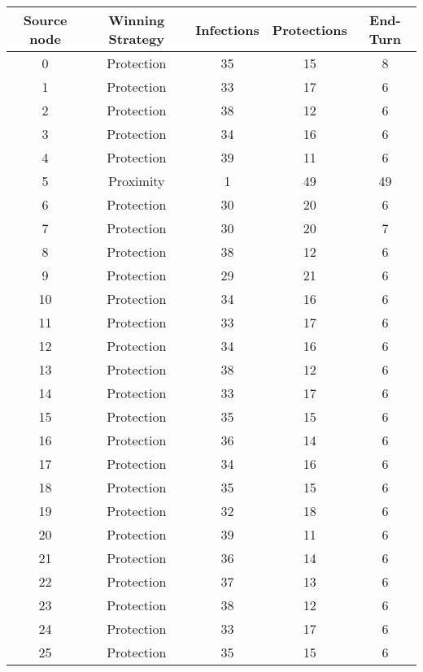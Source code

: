 \documentclass[results.tex]{subfiles}
\begin{document}
\begin{center}
  \begin{tabular}{| c || c | c | c | c |}
    \hline
    {\bfseries Source node} & {\bfseries Winning Strategy} & {\bfseries Infections} & {\bfseries Protections} & {\bfseries End-Turn} \\  %
    \hline\hline
    0 & Protection & 35 & 15 & 8 \\ 
    \hline
    1 & Protection & 33 & 17 & 6 \\ 
    \hline
    2 & Protection & 38 & 12 & 6 \\ 
    \hline
    3 & Protection & 34 & 16 & 6 \\ 
    \hline
    4 & Protection & 39 & 11 & 6 \\ 
    \hline
    5 & Proximity & 1 & 49 & 49 \\ 
    \hline
    6 & Protection & 30 & 20 & 6 \\ 
    \hline
    7 & Protection & 30 & 20 & 7 \\ 
    \hline
    8 & Protection & 38 & 12 & 6 \\ 
    \hline
    9 & Protection & 29 & 21 & 6 \\ 
    \hline
    10 & Protection & 34 & 16 & 6 \\ 
    \hline
    11 & Protection & 33 & 17 & 6 \\ 
    \hline
    12 & Protection & 34 & 16 & 6 \\ 
    \hline
    13 & Protection & 38 & 12 & 6 \\ 
    \hline
    14 & Protection & 33 & 17 & 6 \\ 
    \hline
    15 & Protection & 35 & 15 & 6 \\ 
    \hline
    16 & Protection & 36 & 14 & 6 \\ 
    \hline
    17 & Protection & 34 & 16 & 6 \\ 
    \hline
    18 & Protection & 35 & 15 & 6 \\ 
    \hline
    19 & Protection & 32 & 18 & 6 \\ 
    \hline
    20 & Protection & 39 & 11 & 6 \\ 
    \hline
    21 & Protection & 36 & 14 & 6 \\ 
    \hline
    22 & Protection & 37 & 13 & 6 \\ 
    \hline
    23 & Protection & 38 & 12 & 6 \\ 
    \hline
    24 & Protection & 33 & 17 & 6 \\ 
    \hline
    25 & Protection & 35 & 15 & 6 \\ 

\end{tabular}
\end{center}
\end{document}
